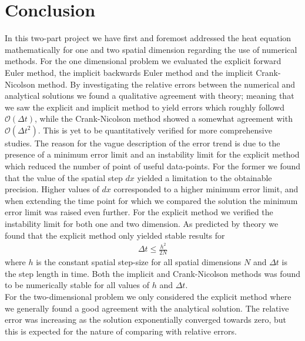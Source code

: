 \documentclass[%
 reprint,
nofootinbib,
aps,
]{revtex4-1}
\begin{document}
\section{Conclusion}
In this two-part project we have first and foremost addressed the heat equation mathematically for one and two spatial dimension regarding the use of numerical methods. For the one dimensional problem we evaluated the explicit forward Euler method, the implicit backwards Euler method and the implicit Crank-Nicolson method. By investigating the relative errors between the numerical and analytical solutions we found a qualitative agreement with theory; meaning that we saw the explicit and implicit method to yield errors which roughly followd $\mathcal{O}(\Delta t)$, while the Crank-Nicolson method showed a somewhat agreement with $\mathcal{O}(\Delta t^2)$. This is yet to be quantitatively verified for more comprehensive studies. The reason for the vague description of the error trend is due to the presence of a minimum error limit and an instability limit for the explicit method which reduced the number of point of useful data-points. For the former we found that the value of the spatial step $dx$ yielded a limitation to the obtainable precision. Higher values of $dx$ corresponded to a higher minimum error limit, and when extending the time point for which we compared the solution the minimum error limit was raised even further. For the explicit method we verified the instability limit for both one and two dimension. As predicted by theory we found that the explicit method only yielded stable results for
\begin{align*}
  \Delta t \leq \frac{h^2}{2N}
\end{align*}
where $h$ is the constant spatial step-size for all spatial dimensions $N$ and $\Delta t$ is the step length in time. Both the implicit and Crank-Nicolson methods was found to be numerically stable for all values of $h$ and $\Delta t$.
\\
For the two-dimensional problem we only considered the explicit method where we generally found a good agreement with the analytical solution. The relative error was increasing as the solution exponentially converged towards zero, but this is expected for the nature of comparing with relative errors.
\\
\end{document}
